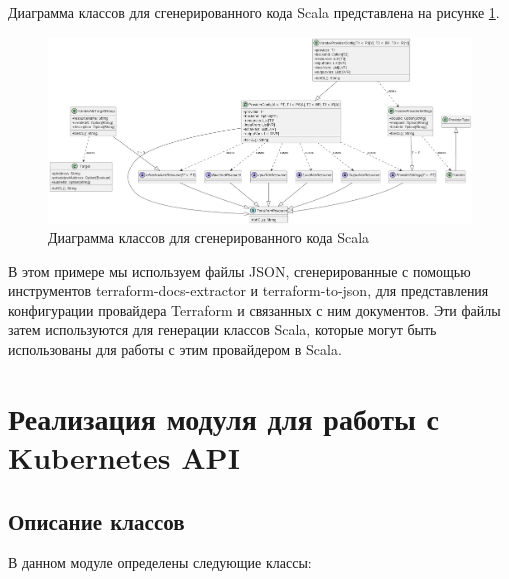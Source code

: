 Диаграмма классов для сгенерированного кода Scala представлена на рисунке
\ref{fig:uml2}.

\begin{figure}[h]
  \centering
  \includegraphics[scale=0.25]{img/6.png}
  \caption{Диаграмма классов для сгенерированного кода Scala}
  \label{fig:uml2}
\end{figure}

В этом примере мы используем файлы JSON, сгенерированные с помощью инструментов
terraform-docs-extractor и terraform-to-json, для представления конфигурации
провайдера Terraform и связанных с ним документов. Эти файлы затем используются
для генерации классов Scala, которые могут быть использованы для работы с этим
провайдером в Scala.

\section{Реализация модуля для работы с Kubernetes API}
\subsection{Описание классов}

В данном модуле определены следующие классы:

